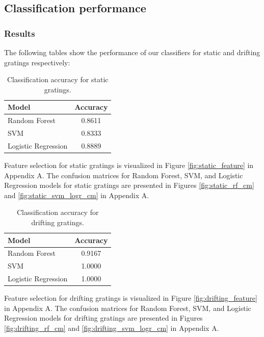 \documentclass[10pt,twocolumn]{article}
\begin{document}
\subsection{Classification performance}

\subsubsection{Results}

The following tables show the performance of our classifiers for static and drifting gratings respectively:

\begin{table}[ht]
\centering
\begin{tabular}{l c}
\hline
\textbf{Model} & \textbf{Accuracy} \\
\hline
Random Forest        & 0.8611 \\
SVM                  & 0.8333 \\
Logistic Regression  & 0.8889 \\
\hline
\end{tabular}
\caption{Classification accuracy for static gratings.}
\label{tab:static_performance}
\end{table}

Feature selection for static gratings is visualized in Figure \ref{fig:static_feature} in Appendix A. The confusion matrices for Random Forest, SVM, and Logistic Regression models for static gratings are presented in Figures \ref{fig:static_rf_cm} and \ref{fig:static_svm_logr_cm} in Appendix A.

\begin{table}[ht]
\centering
\begin{tabular}{l c}
\hline
\textbf{Model} & \textbf{Accuracy} \\
\hline
Random Forest        & 0.9167 \\
SVM                  & 1.0000 \\
Logistic Regression  & 1.0000 \\
\hline
\end{tabular}
\caption{Classification accuracy for drifting gratings.}
\label{tab:drifting_performance}
\end{table}

Feature selection for drifting gratings is visualized in Figure \ref{fig:drifting_feature} in Appendix A. The confusion matrices for Random Forest, SVM, and Logistic Regression models for drifting gratings are presented in Figures \ref{fig:drifting_rf_cm} and \ref{fig:drifting_svm_logr_cm} in Appendix A.
\end{document}
